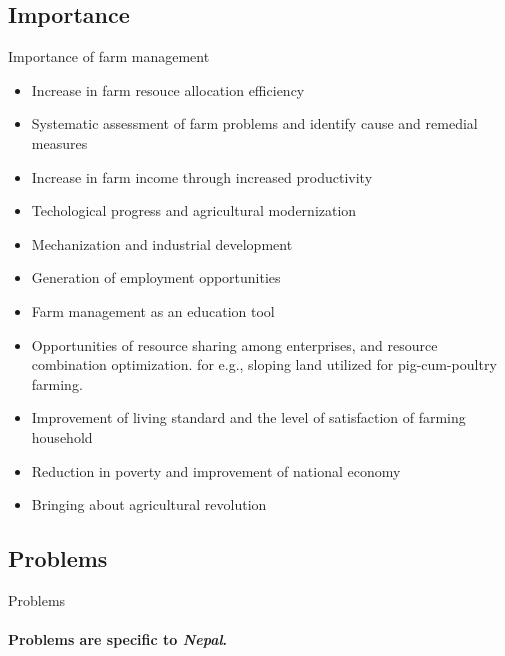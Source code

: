 \documentclass[12pt,ignorenonframetext,aspectratio=169]{beamer}
\providecommand{\tightlist}{%
  \setlength{\itemsep}{0pt}\setlength{\parskip}{0pt}}
\begin{document}
\hypertarget{importance}{%
\subsection{Importance}\label{importance}}

\begin{frame}{Importance of farm management}
\protect\hypertarget{importance-of-farm-management}{}
\begin{itemize}
\tightlist
\item
  Increase in farm resouce allocation efficiency
\item
  Systematic assessment of farm problems and identify cause and remedial
  measures
\item
  Increase in farm income through increased productivity
\item
  Techological progress and agricultural modernization
\item
  Mechanization and industrial development
\item
  Generation of employment opportunities
\item
  Farm management as an education tool
\item
  Opportunities of resource sharing among enterprises, and resource
  combination optimization. for e.g., sloping land utilized for
  pig-cum-poultry farming.
\item
  Improvement of living standard and the level of satisfaction of
  farming household
\item
  Reduction in poverty and improvement of national economy
\item
  Bringing about agricultural revolution
\end{itemize}
\end{frame}

\hypertarget{problems}{%
\subsection{Problems}\label{problems}}

\begin{frame}{Problems}
\framesubtitle{Problems are specific to \textit{Nepal}.}
\end{frame}
\end{document}

